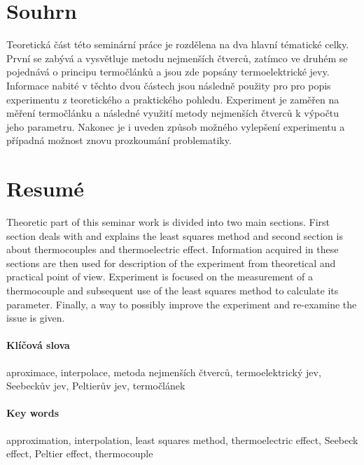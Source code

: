\section[Souhrn (Resumé)]{Souhrn}
Teoretická část této seminární práce je rozdělena na dva hlavní tématické
celky.  První se zabývá a vysvětluje metodu nejmenších čtverců, zatímco ve
druhém se pojednává o principu termočlánků a jsou zde popsány termoelektrické
jevy. Informace nabité v těchto dvou částech jsou následně použity pro pro
popis experimentu z teoretického a praktického pohledu. Experiment je zaměřen
na měření termočlánku a následné využití metody nejmenších čtverců k výpočtu
jeho parametru. Nakonec je i uveden způsob možného vylepšení experimentu a
případná možnost znovu prozkoumání problematiky.

\section*{Resumé}
Theoretic part of this seminar work is divided into two main sections. First
section deals with and explains the least squares method and second section is
about thermocouples and thermoelectric effect. Information acquired in these
sections are then used for description of the experiment from theoretical and
practical point of view. Experiment is focused on the measurement of a
thermocouple and subsequent use of the least squares method to calculate its
parameter. Finally, a way to possibly improve the experiment and re-examine the
issue is given.



\paragraph{Klíčová slova}
aproximace, interpolace, metoda nejmenších čtverců, termoelektrický jev, 
Seebeckův jev, Peltierův jev, termočlánek

\paragraph{Key words}
approximation, interpolation, least squares method, thermoelectric effect, 
Seebeck effect, Peltier effect, thermocouple

